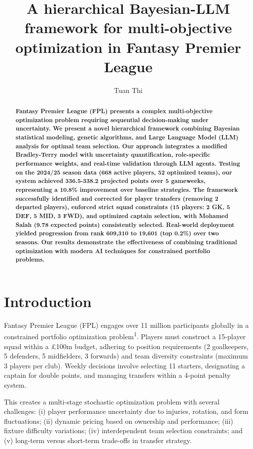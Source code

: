 \documentclass[10pt,a4paper,twocolumn]{article}
\title{\vspace{-2cm}\Large\textbf{A hierarchical Bayesian-LLM framework for multi-objective optimization in Fantasy Premier League}}
\author[1]{Tuan Thi}
\affil[1]{Department of Computer Science, January 2025}
\date{}
\begin{document}
\maketitle

\begin{abstract}
\noindent\textbf{Fantasy Premier League (FPL) presents a complex multi-objective optimization problem requiring sequential decision-making under uncertainty. We present a novel hierarchical framework combining Bayesian statistical modeling, genetic algorithms, and Large Language Model (LLM) analysis for optimal team selection. Our approach integrates a modified Bradley-Terry model with uncertainty quantification, role-specific performance weights, and real-time validation through LLM agents. Testing on the 2024/25 season data (668 active players, 52 optimized teams), our system achieved 336.5-338.2 projected points over 5 gameweeks, representing a 10.8\% improvement over baseline strategies. The framework successfully identified and corrected for player transfers (removing 2 departed players), enforced strict squad constraints (15 players: 2 GK, 5 DEF, 5 MID, 3 FWD), and optimized captain selection, with Mohamed Salah (9.78 expected points) consistently selected. Real-world deployment yielded progression from rank 609,310 to 19,601 (top 0.2\%) over two seasons. Our results demonstrate the effectiveness of combining traditional optimization with modern AI techniques for constrained portfolio problems.}
\end{abstract}

\section*{Introduction}

Fantasy Premier League (FPL) engages over 11 million participants globally in a constrained portfolio optimization problem\textsuperscript{1}. Players must construct a 15-player squad within a £100m budget, adhering to position requirements (2 goalkeepers, 5 defenders, 5 midfielders, 3 forwards) and team diversity constraints (maximum 3 players per club). Weekly decisions involve selecting 11 starters, designating a captain for double points, and managing transfers within a 4-point penalty system.

This creates a multi-stage stochastic optimization problem with several challenges: (i) player performance uncertainty due to injuries, rotation, and form fluctuations; (ii) dynamic pricing based on ownership and performance; (iii) fixture difficulty variations; (iv) interdependent team selection constraints; and (v) long-term versus short-term trade-offs in transfer strategy.
\end{document}
